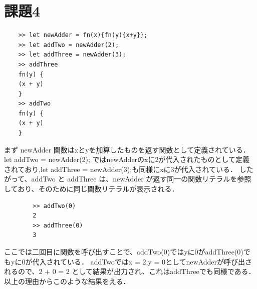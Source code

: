 \documentclass[fleqn, a4paper. 12pt]{ltjsarticle}
\begin{document}
\section{課題4}
\begin{lstlisting}
    >> let newAdder = fn(x){fn(y){x+y}};
    >> let addTwo = newAdder(2);
    >> let addThree = newAdder(3);
    >> addThree
    fn(y) {
    (x + y)
    }
    >> addTwo
    fn(y) {
    (x + y)
    }
    \end{lstlisting}
    まず newAdder 関数はxとyを加算したものを返す関数として定義されている．
    let addTwo = newAdder(2); ではnewAdderのxに2が代入されたものとして定義されており,let addThree = newAdder(3);も同様にxに3が代入されている．
    したがって、addTwo と addThree は、newAdder が返す同一の関数リテラルを参照しており、そのために同じ関数リテラルが表示される．\\
    \begin{lstlisting}
        >> addTwo(0)
        2
        >> addThree(0)
        3
    \end{lstlisting}
    ここでは二回目に関数を呼び出すことで、addTwo(0)ではyに0がaddThree(0)でもyに0が代入されている．
    addTwoではx = 2,y = 0としてnewAdderが呼び出されるので、2 + 0 = 2 として結果が出力され、これはaddThreeでも同様である．
    以上の理由からこのような結果をえる．
\end{document}
